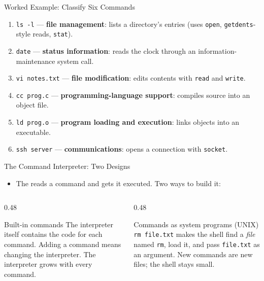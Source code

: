 \documentclass[aspectratio=169]{beamer}
\begin{document}
\begin{frame}{Worked Example: Classify Six Commands}
  \begin{enumerate}
    \item \texttt{ls -l} --- \textbf{file management}: lists a directory's
      entries (uses \texttt{open}, \texttt{getdents}-style reads,
      \texttt{stat}).
    \item \texttt{date} --- \textbf{status information}: reads the clock
      through an information-maintenance system call.
    \item \texttt{vi notes.txt} --- \textbf{file modification}: edits contents
      with \texttt{read} and \texttt{write}.
    \item \texttt{cc prog.c} --- \textbf{programming-language support}:
      compiles source into an object file.
    \item \texttt{ld prog.o} --- \textbf{program loading and execution}: links
      objects into an executable.
    \item \texttt{ssh server} --- \textbf{communications}: opens a connection
      with \texttt{socket}.
  \end{enumerate}
  \vspace{0.1cm}
\end{frame}

\begin{frame}{The Command Interpreter: Two Designs}
  \begin{itemize}
    \item The  reads a command and gets it executed. Two ways to
      build it:
  \end{itemize}
  \vspace{0.1cm}
  \begin{columns}[T]
    \begin{column}{0.48\textwidth}
      \begin{block}{Built-in commands}
        The interpreter itself contains the code for each command. Adding a
        command means changing the interpreter. The interpreter grows with
        every command.
      \end{block}
    \end{column}
    \begin{column}{0.48\textwidth}
      \begin{block}{Commands as system programs (UNIX)}
        \texttt{rm file.txt} makes the shell find a \emph{file} named
        \texttt{rm}, load it, and pass \texttt{file.txt} as an argument. New
        commands are new files; the shell stays small.
      \end{block}
    \end{column}
  \end{columns}
  \vspace{0.2cm}
\end{frame}
\end{document}

